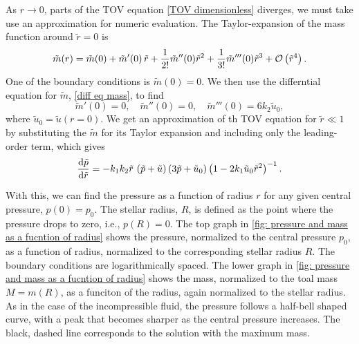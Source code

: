 As $r \rightarrow 0$, parts of the TOV equation \autoref{TOV dimensionless} diverges, we must take use an approximation for numeric evaluation.
The Taylor-expansion of the mass function around $\tilde r = 0$ is
%
\begin{equation}
    \tilde m(r) = \tilde m(0) + \tilde m'(0) \, \tilde r + \frac{1}{2!} \tilde m''(0) \tilde r^2
    + \frac{1}{3!} \tilde m'''(0) \tilde r^3 + \mathcal O\left(\tilde r^4\right).
\end{equation}
%
One of the boundary conditions is $\tilde m(0) = 0$.
We then use the differntial equation for $\tilde m$, \autoref{diff eq mass}, to find
%
\begin{equation}
    \tilde m'(0) = 0, \quad
    \tilde m''(0) = 0, \quad
    \tilde m'''(0) = 6 k_2 \tilde u_0,
\end{equation}
%
where $\tilde u_0 = \tilde u(r = 0)$.
We get an approximation of th TOV equation for $\tilde r \ll 1$ by substituting the $\tilde m$ for its Taylor expansion and including only the leading-order term, which gives
%
\begin{equation}
    \diff{\tilde p}{\tilde r}
    = - k_1 k_2 \tilde r \, \left(\tilde p + \tilde u\right)
    \left( 3 \tilde p + \tilde u_0  \right)
    \left(1 - 2 k_1 \tilde u_0 \tilde r^2\right)^{-1}.
\end{equation}
%

With this, we can find the pressure as a function of radius $r$ for any given central pressure, $p(0) = p_0$.
The stellar radius, $R$, is defined as the point where the pressure drops to zero, i.e., $p(R) = 0$.
The top graph in \autoref{fig: pressure and mass as a fucntion of radius} shows the pressure, normalized to the central pressure $p_0$, as a function of radius, normalized to the corresponding stellar radius $R$.
The boundary conditions are logarithmically spaced.
The lower graph in \autoref{fig: pressure and mass as a fucntion of radius} shows the mass, normalized to the toal mass $M = m(R)$, as a funciton of the radius, again normalized to the stellar radius.
As in the case of the incompressible fluid, the pressure follows a half-bell shaped curve, with a peak that becomes sharper as the central pressure increases.
The black, dashed line corresponds to the solution with the maximum mass.

